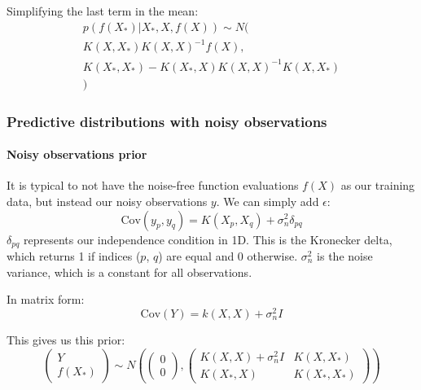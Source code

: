 Simplifying the last term in the mean:
\begin{equation} \label{eq:conditioning}
    \begin{aligned}
        p(f(X_*)|X_*, X, f(X)) \sim N( \\
        K(X,X_*)K(X,X)^{-1}f(X), \\
        K(X_*,X_*) - K(X_*,X)K(X,X)^{-1}K(X,X_*) \\
        )
    \end{aligned}
\end{equation}


\subsubsection{Predictive distributions with noisy observations}
\paragraph{Noisy observations prior}
It is typical to not have the noise-free function evaluations $f(X)$ as our training data, but instead our noisy observations $y$. We can simply add $\epsilon$:
\begin{equation*}
    \text{Cov}(y_p, y_q) = K(X_p, X_q) + \sigma^2_n\delta_{pq}
\end{equation*}
$\delta_{pq}$ represents our independence condition in 1D. This is the Kronecker delta, which returns 1 if indices ($p$, $q$) are equal and 0 otherwise. $\sigma^2_n$ is the noise variance, which is a constant for all observations.
    
In matrix form:
\begin{equation*}
    \text{Cov}(Y) = k(X,X) + \sigma^2_nI
\end{equation*}
    
This gives us this prior:
\begin{equation*}
    \begin{pmatrix}
        Y \\ f(X_*)
    \end{pmatrix} \sim N\left(
    \begin{pmatrix}
        0 \\ 0
    \end{pmatrix},
    \begin{pmatrix}
        K(X,X) + \sigma^2_nI & K(X,X_*) \\ K(X_*,X) & K(X_*,X_*)
    \end{pmatrix}
    \right)
\end{equation*}

